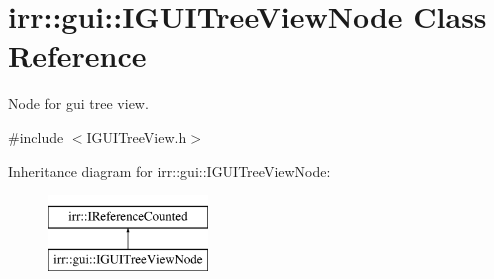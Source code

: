 \hypertarget{classirr_1_1gui_1_1IGUITreeViewNode}{}\section{irr\+:\+:gui\+:\+:I\+G\+U\+I\+Tree\+View\+Node Class Reference}
\label{classirr_1_1gui_1_1IGUITreeViewNode}


Node for gui tree view.  




{\ttfamily \#include $<$I\+G\+U\+I\+Tree\+View.\+h$>$}

Inheritance diagram for irr\+:\+:gui\+:\+:I\+G\+U\+I\+Tree\+View\+Node\+:\begin{figure}[H]
\begin{center}
\leavevmode
\includegraphics[height=2.000000cm]{classirr_1_1gui_1_1IGUITreeViewNode}
\end{center}
\end{figure}
